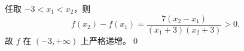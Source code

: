 任取 $-3<x_1<x_2$，则
\[
f(x_2)-f(x_1)=\frac{7(x_2-x_1)}{(x_1+3)(x_2+3)}>0.
\]
故 $f$ 在 $(-3,+\infty)$ 上严格递增。\qed
